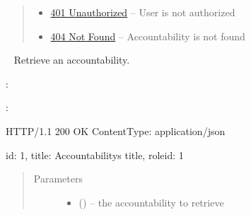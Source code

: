 \documentclass[letterpaper,10pt,english]{sphinxmanual}
\begin{document}
\begin{fulllineitems}
\begin{quote}
\begin{description}
\begin{itemize}
\item {} 
\href{http://www.w3.org/Protocols/rfc2616/rfc2616-sec10.html\#sec10.4.2}{401 Unauthorized} -- User is not authorized

\item {} 
\href{http://www.w3.org/Protocols/rfc2616/rfc2616-sec10.html\#sec10.4.5}{404 Not Found} -- Accountability is not found

\end{itemize}

\end{description}\end{quote}

\end{fulllineitems}



\begin{fulllineitems}
\label{\detokenize{resources/accountability:get--accountabilities-(accountability_id)}}~
Retrieve an accountability.

:

\begin{sphinxVerbatim}[commandchars=\\\{\}]
  
 
 
\end{sphinxVerbatim}

:

\begin{sphinxVerbatim}[commandchars=\\\{\}]
HTTP/1.1 200 OK
Content\PYGZhy{}Type: application/json

\PYGZob{}
    \PYGZsq{}id\PYGZsq{}: 1,
    \PYGZsq{}title\PYGZsq{}: \PYGZsq{}Accountability\PYGZsq{}s title\PYGZsq{},
    \PYGZsq{}role\PYGZus{}id\PYGZsq{}: 1
\PYGZcb{}
\end{sphinxVerbatim}
\begin{quote}\begin{description}
\item[{Parameters}] \leavevmode\begin{itemize}
\item {} 
 () -- the accountability to retrieve


\end{itemize}
\end{description}
\end{quote}
\end{fulllineitems}
\end{document}
